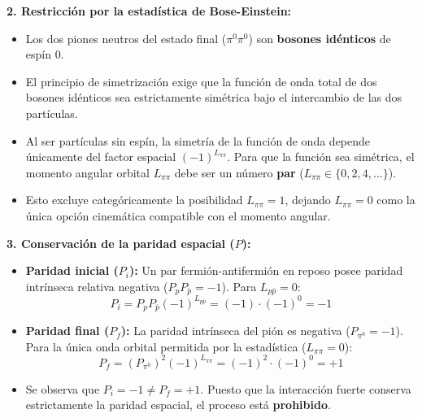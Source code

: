 \begin{problema}
\textbf{2. Restricción por la estadística de Bose-Einstein:}
\begin{itemize}
    \item Los dos piones neutros del estado final ($\pi^0\pi^0$) son \textbf{bosones idénticos} de espín 0.
    \item El principio de simetrización exige que la función de onda total de dos bosones idénticos sea estrictamente simétrica bajo el intercambio de las dos partículas.
    \item Al ser partículas sin espín, la simetría de la función de onda depende únicamente del factor espacial $(-1)^{L_{\pi\pi}}$. Para que la función sea simétrica, el momento angular orbital $L_{\pi\pi}$ debe ser un número \textbf{par} ($L_{\pi\pi} \in \{0, 2, 4, \dots\}$).
    \item Esto excluye categóricamente la posibilidad $L_{\pi\pi} = 1$, dejando $L_{\pi\pi} = 0$ como la única opción cinemática compatible con el momento angular.
\end{itemize}

\textbf{3. Conservación de la paridad espacial ($P$):}
\begin{itemize}
    \item \textbf{Paridad inicial ($P_i$):} Un par fermión-antifermión en reposo posee paridad intrínseca relativa negativa ($P_p P_{\bar{p}} = -1$). Para $L_{p\bar{p}} = 0$:
    \begin{equation*}
        P_i = P_p P_{\bar{p}} (-1)^{L_{p\bar{p}}} = (-1) \cdot (-1)^0 = -1
    \end{equation*}
    \item \textbf{Paridad final ($P_f$):} La paridad intrínseca del pión es negativa ($P_{\pi^0} = -1$). Para la única onda orbital permitida por la estadística ($L_{\pi\pi} = 0$):
    \begin{equation*}
        P_f = (P_{\pi^0})^2 (-1)^{L_{\pi\pi}} = (-1)^2 \cdot (-1)^0 = +1
    \end{equation*}
    \item Se observa que $P_i = -1 \neq P_f = +1$. Puesto que la interacción fuerte conserva estrictamente la paridad espacial, el proceso está \textbf{prohibido}.
\end{itemize}


\end{problema}
